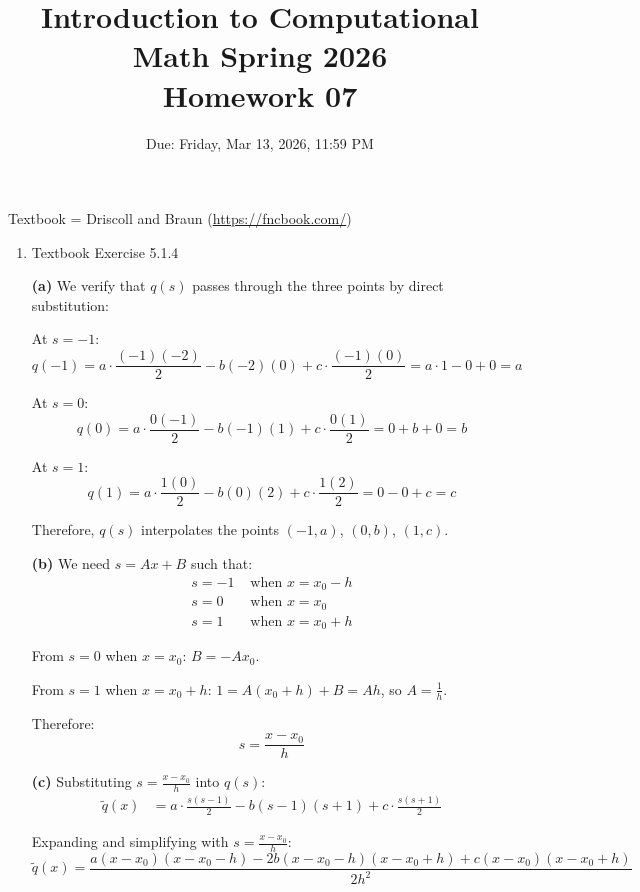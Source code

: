 \documentclass[reqno, answers]{exam}
\title{Introduction to Computational Math Spring 2026 \\ Homework 07}
\date{Due: Friday, Mar 13, 2026, 11:59 PM}
\author{}
\begin{document}
\maketitle
\thispagestyle{empty}

Textbook = Driscoll and Braun (\url{https://fncbook.com/})

\begin{enumerate}

    \item Textbook Exercise 5.1.4
          \begin{solution}
              \textbf{(a)} We verify that $q(s)$ passes through the three points by direct substitution:

              At $s = -1$:
              $$q(-1) = a \cdot \frac{(-1)(-2)}{2} - b(-2)(0) + c \cdot \frac{(-1)(0)}{2} = a \cdot 1 - 0 + 0 = a$$

              At $s = 0$:
              $$q(0) = a \cdot \frac{0(-1)}{2} - b(-1)(1) + c \cdot \frac{0(1)}{2} = 0 + b + 0 = b$$

              At $s = 1$:
              $$q(1) = a \cdot \frac{1(0)}{2} - b(0)(2) + c \cdot \frac{1(2)}{2} = 0 - 0 + c = c$$

              Therefore, $q(s)$ interpolates the points $(-1,a)$, $(0,b)$, $(1,c)$.

              \textbf{(b)} We need $s = Ax + B$ such that:
              \begin{align*}
                  s = -1 & \text{ when } x = x_0 - h \\
                  s = 0  & \text{ when } x = x_0     \\
                  s = 1  & \text{ when } x = x_0 + h
              \end{align*}

              From $s = 0$ when $x = x_0$: $B = -Ax_0$.

              From $s = 1$ when $x = x_0 + h$: $1 = A(x_0 + h) + B = Ah$, so $A = \frac{1}{h}$.

              Therefore: $$s = \frac{x - x_0}{h}$$

              \textbf{(c)} Substituting $s = \frac{x - x_0}{h}$ into $q(s)$:
              \begin{align*}
                  \tilde{q}(x) & = a \cdot \frac{s(s-1)}{2} - b(s-1)(s+1) + c \cdot \frac{s(s+1)}{2}
              \end{align*}

              Expanding and simplifying with $s = \frac{x-x_0}{h}$:
              $$\tilde{q}(x) = \frac{a(x-x_0)(x-x_0-h) - 2b(x-x_0-h)(x-x_0+h) + c(x-x_0)(x-x_0+h)}{2h^2}$$


\end{solution}
\end{enumerate}
\end{document}
